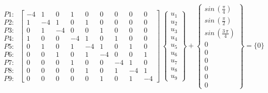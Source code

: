 \begin{enumerate}
\[
\begin{array}{l}
 P1: \\
 P2: \\
 P3: \\
 P4: \\
 P5: \\
 P6: \\
 P7: \\
 P8: \\
 P9:
\end{array}
\,
\left[
\begin{array}{rrrrrrrrr}
 -4 &  1 &  0 &  1 &  0 &  0 &  0 &  0 &  0\\
  1 & -4 &  1 &  0 &  1 &  0 &  0 &  0 &  0\\
  0 &  1 & -4 &  0 &  0 &  1 &  0 &  0 &  0\\
  1 &  0 &  0 & -4 &  1 &  0 &  1 &  0 &  0\\
  0 &  1 &  0 &  1 & -4 &  1 &  0 &  1 &  0\\
  0 &  0 &  1 &  0 &  1 & -4 &  0 &  0 &  1\\
  0 &  0 &  0 &  1 &  0 &  0 & -4 &  1 &  0\\
  0 &  0 &  0 &  0 &  1 &  0 &  1 & -4 &  1\\
  0 &  0 &  0 &  0 &  0 &  1 &  0 &  1 & -4
\end{array}
\right]
\,
\left\{
\begin{array}{l}
 u_1 \\
 u_2 \\
 u_3 \\
 u_4 \\
 u_5 \\
 u_6 \\
 u_7 \\
 u_8 \\
 u_9
\end{array}
\right\}
+
\left\{
\begin{array}{c}
 sin\,\left(\frac{\pi}{4}\right) \\
 sin\,\left(\frac{\pi}{2}\right) \\
 sin\,\left(\frac{3\,\pi}{4}\right) \\
 0 \\
 0 \\
 0 \\
 0 \\
 0 \\
 0
\end{array}
\right\}
=
\{0\}
\]

\end{enumerate}
